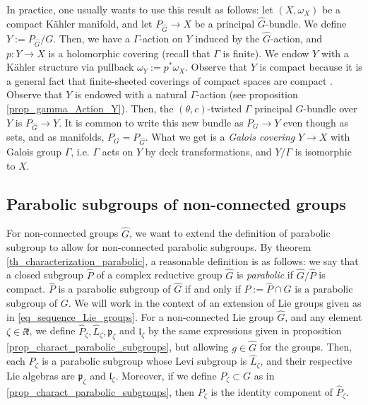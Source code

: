 \begin{obs} \label{obs_equivalence_categories}
    In practice, one usually wants to use this result as follows: let \((X, \omega_X)\) be a compact Kähler manifold, and let \(P_{\hat{G}} \to X\) be a principal \(\hat{G}\)-bundle. We define \(Y:=P_{\hat{G}}/G\). Then, we have a \(\Gamma\)-action on \(Y\) induced by the \(\hat{G}\)-action, and \(p\colon Y \to X\) is a holomorphic covering (recall that \(\Gamma\) is finite). We endow \(Y\) with a Kähler structure via pullback \(\omega_Y:=p^*\omega_X\). Observe that \(Y\) is compact because it is a general fact that finite-sheeted coverings of compact spaces are compact \parencite[Page 341]{munkres2000topology}.  Observe that \(Y\) is endowed with a natural \(\Gamma\)-action (see proposition \ref{prop_gamma_Action_Y}). Then, the \((\theta,c)\)-twisted \(\Gamma\) principal \(G\)-bundle over \(Y\) is \(P_{\hat{G}}\to Y\). It is common to write this new bundle as \(P_G \to Y\) even though as sets, and as manifolds, \(P_G=P_{\hat{G}}\). What we get is a \textit{Galois covering} \(Y \to X\) with Galois group \(\Gamma\), i.e. \(\Gamma\) acts on \(Y\) by deck transformations, and \(Y/\Gamma\) is isomorphic to \(X\).
\end{obs}

\subsection{Parabolic subgroups of non-connected groups}
For non-connected groups \(\hat{G}\), we want to extend the definition of parabolic subgroup to allow for non-connected parabolic subgroups. By theorem \ref{th_characterization_parabolic}, a reasonable definition is as follows: we say that a closed subgroup \(\hat{P}\) of a complex reductive group \(\hat{G}\) is \textit{parabolic} if \(\hat{G}/\hat{P}\) is compact. \(\hat{P}\) is a parabolic subgroup of \(\hat{G}\) if and only if \(P:=\hat{P}\cap G\) is a parabolic subgroup of \(G\). We will work in the context of an extension of Lie groups given as in \eqref{eq_sequence_Lie_groups}. For a non-connected Lie group \(\hat{G}\), and any element \(\zeta \in \ii \mathfrak{k}\), we define \(\hat{P}_\zeta, \hat{L}_\zeta, \mathfrak{p}_\zeta\) and \(\mathfrak{l}_\zeta\) by the same expressions given in proposition \ref{prop_charact_parabolic_subgroups}, but allowing \(g \in \hat{G}\) for the groups. Then, each \(\hat{P}_\zeta\) is a parabolic subgroup whose Levi subgroup is \(\hat{L}_\zeta\), and their respective Lie algebras are \(\mathfrak{p}_\zeta\) and \(\mathfrak{l}_\zeta\). Moreover, if we define \(P_\zeta\subset G\) as in \ref{prop_charact_parabolic_subgroups}, then \(P_\zeta\) is the identity component of \(\hat{P}_\zeta\). 



